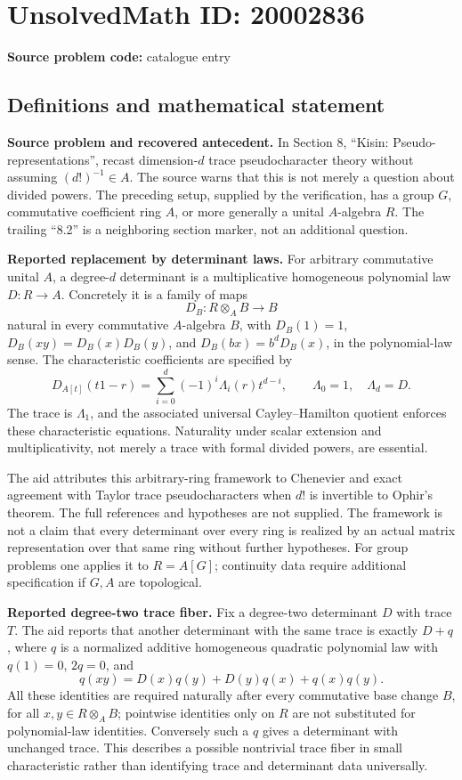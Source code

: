 \documentclass[11pt]{article}
\begin{document}
\section*{UnsolvedMath ID: 20002836}
\textbf{Source problem code:} catalogue entry
\subsection{Definitions and mathematical statement}
\textbf{Source problem and recovered antecedent.} In Section 8, ``Kisin: Pseudo-representations'', recast dimension-\(d\) trace pseudocharacter theory without assuming \((d!)^{-1}\in A\). The source warns that this is not merely a question about divided powers. The preceding setup, supplied by the verification, has a group \(G\), commutative coefficient ring \(A\), or more generally a unital \(A\)-algebra \(R\). The trailing ``8.2'' is a neighboring section marker, not an additional question.

\textbf{Reported replacement by determinant laws.} For arbitrary commutative unital \(A\), a degree-\(d\) determinant is a multiplicative homogeneous polynomial law \(D:R\to A\). Concretely it is a family of maps
\[
 D_B:R\otimes_A B\to B
\]
natural in every commutative \(A\)-algebra \(B\), with \(D_B(1)=1\), \(D_B(xy)=D_B(x)D_B(y)\), and \(D_B(bx)=b^dD_B(x)\), in the polynomial-law sense. The characteristic coefficients are specified by
\[
 D_{A[t]}(t1-r)=\sum_{i=0}^d(-1)^i\Lambda_i(r)t^{d-i},
 \qquad\Lambda_0=1,\quad\Lambda_d=D.
\]
The trace is \(\Lambda_1\), and the associated universal Cayley--Hamilton quotient enforces these characteristic equations. Naturality under scalar extension and multiplicativity, not merely a trace with formal divided powers, are essential.

The aid attributes this arbitrary-ring framework to Chenevier and exact agreement with Taylor trace pseudocharacters when \(d!\) is invertible to Ophir's theorem. The full references and hypotheses are not supplied. The framework is not a claim that every determinant over every ring is realized by an actual matrix representation over that same ring without further hypotheses. For group problems one applies it to \(R=A[G]\); continuity data require additional specification if \(G,A\) are topological.

\textbf{Reported degree-two trace fiber.} Fix a degree-two determinant \(D\) with trace \(T\). The aid reports that another determinant with the same trace is exactly \(D+q\), where \(q\) is a normalized additive homogeneous quadratic polynomial law with \(q(1)=0\), \(2q=0\), and
\[
 q(xy)=D(x)q(y)+D(y)q(x)+q(x)q(y).
\]
All these identities are required naturally after every commutative base change \(B\), for all \(x,y\in R\otimes_A B\); pointwise identities only on \(R\) are not substituted for polynomial-law identities. Conversely such a \(q\) gives a determinant with unchanged trace. This describes a possible nontrivial trace fiber in small characteristic rather than identifying trace and determinant data universally.
\end{document}
